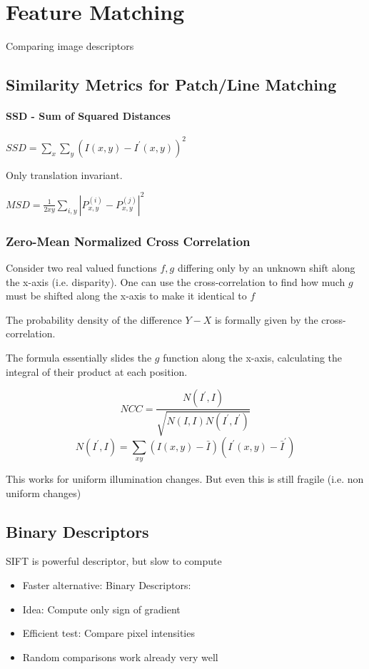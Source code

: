 \section{Feature Matching}

Comparing image descriptors

\subsection{ Similarity Metrics for Patch/Line Matching}

\paragraph*{ SSD - Sum of Squared Distances}

$SSD = \sum_x \sum_y (I(x,y) - I^\prime(x,y))^2$

Only translation invariant.

$MSD=\frac{1}{2xy} \sum_{i,y}\left|P_{x,y}^{(i)} - P^{(j)}_{x,y}\right|^2$

\subsubsection{Zero-Mean Normalized Cross Correlation}
Consider two real valued functions  $f,g$  differing only by an unknown shift along the x-axis (i.e. disparity). One can use the cross-correlation to find how much $g$ must be shifted along the x-axis to make it identical to $f$ 

The probability density of the difference $Y-X$ is formally given by the cross-correlation.

The formula essentially slides the $g$ function along the x-axis, calculating the integral of their product at each position.

$$ NCC = \frac{N(I^\prime,I)}{\sqrt{N(I,I)N(I^\prime,I^\prime)}} $$
$$ N(I^\prime,I) = \sum_{xy} (I(x,y) - \bar I )(I^\prime(x,y) - \bar I^\prime ) $$

This works for uniform illumination changes. But even this is still fragile (i.e. non uniform changes)

\subsection{Binary Descriptors}

SIFT is powerful descriptor, but slow to compute
\begin{itemize}
\item Faster alternative: Binary Descriptors:
\item Idea: Compute only sign of gradient
\item Efficient test: Compare pixel intensities
\item Random comparisons work already very well
\end{itemize}

